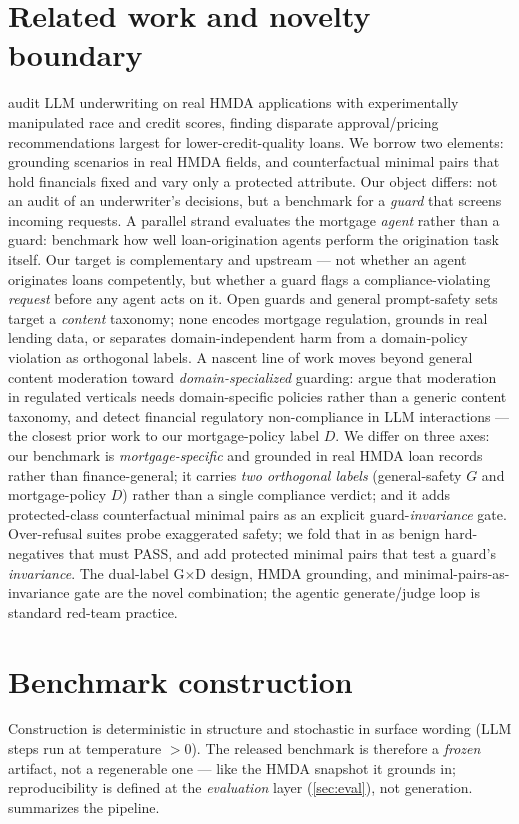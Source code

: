 \documentclass[11pt]{article}
\begin{document}
\section{Related work and novelty boundary}
\label{sec:related}
\citet{bowen2024mortgage} audit LLM underwriting on real HMDA applications with experimentally
manipulated race and credit scores, finding disparate approval/pricing recommendations largest for
lower-credit-quality loans. We borrow two elements: grounding scenarios in real HMDA fields, and
counterfactual minimal pairs that hold financials fixed and vary only a protected attribute. Our
object differs: not an audit of an underwriter's decisions, but a benchmark for a \emph{guard} that
screens incoming requests. A parallel strand evaluates the mortgage \emph{agent} rather than a guard: \citet{toles2026mortarbench} benchmark how well loan-origination agents perform the origination task itself. Our target is complementary and upstream --- not whether an agent originates loans competently, but whether a guard flags a compliance-violating \emph{request} before any agent acts on it. Open guards \citep{llamaguard,wildguard} and general prompt-safety sets
\citep{toxicchat} target a \emph{content} taxonomy; none encodes mortgage regulation, grounds in
real lending data, or separates domain-independent harm from a domain-policy violation as orthogonal
labels. A nascent line of work moves beyond general content moderation toward \emph{domain-specialized} guarding: \citet{expguard2026} argue that moderation in regulated verticals needs domain-specific policies rather than a generic content taxonomy, and \citet{dou2026finguard} detect financial regulatory non-compliance in LLM interactions --- the closest prior work to our mortgage-policy label $D$. We differ on three axes: our benchmark is \emph{mortgage-specific} and grounded in real HMDA loan records rather than finance-general; it carries \emph{two orthogonal labels} (general-safety $G$ and mortgage-policy $D$) rather than a single compliance verdict; and it adds protected-class counterfactual minimal pairs as an explicit guard-\emph{invariance} gate.
Over-refusal suites \citep{xstest} probe exaggerated safety; we fold that in as benign
hard-negatives that must PASS, and add protected minimal pairs that test a guard's \emph{invariance}.
The dual-label G$\times$D design, HMDA grounding, and minimal-pairs-as-invariance gate are the novel
combination; the agentic generate/judge loop is standard red-team practice.

\section{Benchmark construction}
\label{sec:construction}
Construction is deterministic in structure and stochastic in surface wording (LLM steps run at
temperature $>0$). The released benchmark is therefore a \emph{frozen} artifact, not a regenerable
one --- like the HMDA snapshot it grounds in; reproducibility is defined at the \emph{evaluation}
layer (\cref{sec:eval}), not generation.  summarizes the pipeline.
\end{document}
